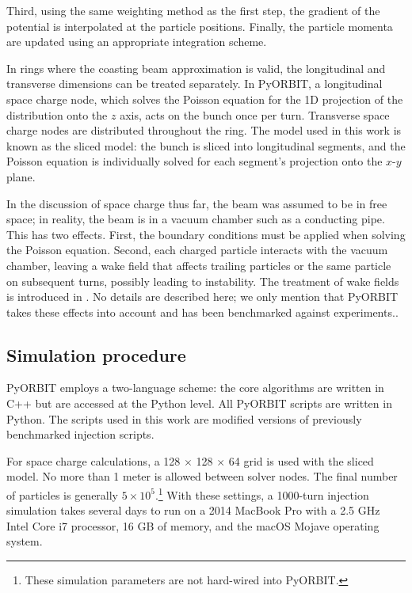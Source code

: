 %
Third, using the same weighting method as the first step, the gradient of the potential is interpolated at the particle positions. Finally, the particle momenta are updated using an appropriate integration scheme.

In rings where the coasting beam approximation is valid, the longitudinal and transverse dimensions can be treated separately. In PyORBIT, a longitudinal space charge node, which solves the Poisson equation for the 1D projection of the distribution onto the $z$ axis, acts on the bunch once per turn. Transverse space charge nodes are distributed throughout the ring. The model used in this work is known as the sliced model: the bunch is sliced into longitudinal segments, and the Poisson equation is individually solved for each segment's projection onto the $x$-$y$ plane.

In the discussion of space charge thus far, the beam was assumed to be in free space; in reality, the beam is in a vacuum chamber such as a conducting pipe. This has two effects. First, the boundary conditions must be applied when solving the Poisson equation. Second, each charged particle interacts with the vacuum chamber, leaving a wake field that affects trailing particles or the same particle on subsequent turns, possibly leading to instability. The treatment of wake fields is introduced in \cite{Chao1993}. No details are described here; we only mention that PyORBIT takes these effects into account and has been benchmarked against experiments.\cite{Holmes2011}.






\subsection{Simulation procedure}

PyORBIT employs a two-language scheme: the core algorithms are written in C++ but are accessed at the Python level. All PyORBIT scripts are written in Python. The scripts used in this work are modified versions of previously benchmarked injection scripts.

For space charge calculations, a 128 $\times$ 128 $\times$ 64 grid is used with the sliced model. No more than 1 meter is allowed between solver nodes. The final number of particles is generally $5 \times 10^{5}$.\footnote{These simulation parameters are not hard-wired into PyORBIT.} With these settings, a 1000-turn injection simulation takes several days to run on a 2014 MacBook Pro with a 2.5 GHz Intel Core i7 processor, 16 GB of memory, and the macOS Mojave operating system.


